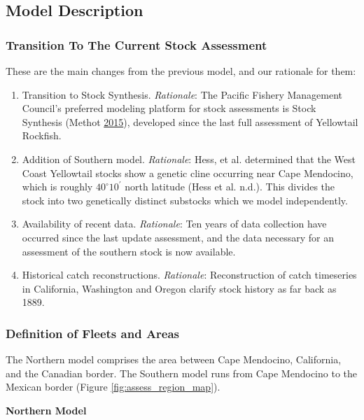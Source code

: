 \documentclass[12pt,]{article}
\begin{document}
\subsection{Model Description}\label{model-description}

\subsubsection{Transition To The Current Stock
Assessment}\label{transition-to-the-current-stock-assessment}

These are the main changes from the previous model, and our rationale
for them:

\begin{enumerate}
\def\labelenumi{\arabic{enumi}.}
\item
  Transition to Stock Synthesis. \emph{Rationale}: The Pacific Fishery
  Management Council's preferred modeling platform for stock assessments
  is Stock Synthesis (Methot \protect\hyperlink{ref-Methot2015}{2015}),
  developed since the last full assessment of Yellowtail Rockfish.
\item
  Addition of Southern model. \emph{Rationale}: Hess, et al. determined
  that the West Coast Yellowtail stocks show a genetic cline occurring
  near Cape Mendocino, which is roughly \(40^\circ 10^\prime\) north
  latitude (Hess et al. n.d.). This divides the stock into two
  genetically distinct substocks which we model independently.
\item
  Availability of recent data. \emph{Rationale}: Ten years of data
  collection have occurred since the last update assessment, and the
  data necessary for an assessment of the southern stock is now
  available.
\item
  Historical catch reconstructions. \emph{Rationale}: Reconstruction of
  catch timeseries in California, Washington and Oregon clarify stock
  history as far back as 1889.
\end{enumerate}

\subsubsection{Definition of Fleets and
Areas}\label{definition-of-fleets-and-areas}

The Northern model comprises the area between Cape Mendocino,
California, and the Canadian border. The Southern model runs from Cape
Mendocino to the Mexican border (Figure \ref{fig:assess_region_map}).

\textbf{Northern Model}
\end{document}
